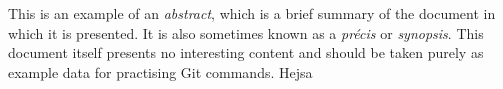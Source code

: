 This is an example of an \emph{abstract}, which is a brief summary of the document in which it is presented.
It is also sometimes known as a \emph{précis} or \emph{synopsis}.
This document itself presents no interesting content and should be taken purely as example data for practising Git commands.
Hejsa
